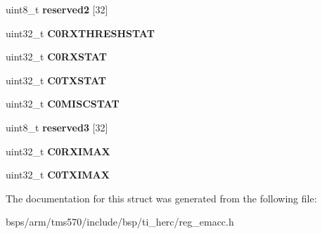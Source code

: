 \begin{DoxyCompactItemize}
uint8\+\_\+t {\bfseries reserved2} \mbox{[}32\mbox{]}
\item 
\mbox{\label{structtms570__emacc__t_a7a7d717d556cddb2e1cf810b9b041e64}} 
uint32\+\_\+t {\bfseries C0\+R\+X\+T\+H\+R\+E\+S\+H\+S\+T\+AT}
\item 
\mbox{\label{structtms570__emacc__t_a3f5c5c39733e2fe8d180a5bca218fd23}} 
uint32\+\_\+t {\bfseries C0\+R\+X\+S\+T\+AT}
\item 
\mbox{\label{structtms570__emacc__t_afba3092b0ac491389d06c15891cdb979}} 
uint32\+\_\+t {\bfseries C0\+T\+X\+S\+T\+AT}
\item 
\mbox{\label{structtms570__emacc__t_a7a9875f4a7e43c2d195461402063e851}} 
uint32\+\_\+t {\bfseries C0\+M\+I\+S\+C\+S\+T\+AT}
\item 
\mbox{\label{structtms570__emacc__t_abd5719a73ddffada6a53b2edf3f75371}} 
uint8\+\_\+t {\bfseries reserved3} \mbox{[}32\mbox{]}
\item 
\mbox{\label{structtms570__emacc__t_a9ffc3353a4a578406a3b7f02e67bacbb}} 
uint32\+\_\+t {\bfseries C0\+R\+X\+I\+M\+AX}
\item 
\mbox{\label{structtms570__emacc__t_a39fefcaad2a21bb8fcd1219483d4b9d0}} 
uint32\+\_\+t {\bfseries C0\+T\+X\+I\+M\+AX}
\end{DoxyCompactItemize}


The documentation for this struct was generated from the following file\+:\begin{DoxyCompactItemize}
\item 
bsps/arm/tms570/include/bsp/ti\+\_\+herc/reg\+\_\+emacc.\+h\end{DoxyCompactItemize}
